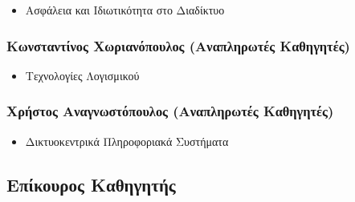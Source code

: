 \documentclass[
]{article}
\begin{document}
\begin{itemize}
\item
  Ασφάλεια και Ιδιωτικότητα στο Διαδίκτυο
\end{itemize}

\hypertarget{ux3baux3c9ux3bdux3c3ux3c4ux3b1ux3bdux3c4ux3afux3bdux3bfux3c2-ux3c7ux3c9ux3c1ux3b9ux3b1ux3bdux3ccux3c0ux3bfux3c5ux3bbux3bfux3c2-ux3b1ux3bdux3b1ux3c0ux3bbux3b7ux3c1ux3c9ux3c4ux3adux3c2-ux3baux3b1ux3b8ux3b7ux3b3ux3b7ux3c4ux3adux3c2}{%
\subsubsection{Κωνσταντίνος Χωριανόπουλος (Αναπληρωτές
Καθηγητές)}\label{ux3baux3c9ux3bdux3c3ux3c4ux3b1ux3bdux3c4ux3afux3bdux3bfux3c2-ux3c7ux3c9ux3c1ux3b9ux3b1ux3bdux3ccux3c0ux3bfux3c5ux3bbux3bfux3c2-ux3b1ux3bdux3b1ux3c0ux3bbux3b7ux3c1ux3c9ux3c4ux3adux3c2-ux3baux3b1ux3b8ux3b7ux3b3ux3b7ux3c4ux3adux3c2}}

\begin{itemize}
\item
  Τεχνολογίες Λογισμικού
\end{itemize}

\hypertarget{ux3c7ux3c1ux3aeux3c3ux3c4ux3bfux3c2-ux3b1ux3bdux3b1ux3b3ux3bdux3c9ux3c3ux3c4ux3ccux3c0ux3bfux3c5ux3bbux3bfux3c2-ux3b1ux3bdux3b1ux3c0ux3bbux3b7ux3c1ux3c9ux3c4ux3adux3c2-ux3baux3b1ux3b8ux3b7ux3b3ux3b7ux3c4ux3adux3c2}{%
\subsubsection{Χρήστος Αναγνωστόπουλος (Αναπληρωτές
Καθηγητές)}\label{ux3c7ux3c1ux3aeux3c3ux3c4ux3bfux3c2-ux3b1ux3bdux3b1ux3b3ux3bdux3c9ux3c3ux3c4ux3ccux3c0ux3bfux3c5ux3bbux3bfux3c2-ux3b1ux3bdux3b1ux3c0ux3bbux3b7ux3c1ux3c9ux3c4ux3adux3c2-ux3baux3b1ux3b8ux3b7ux3b3ux3b7ux3c4ux3adux3c2}}

\begin{itemize}
\item
  Δικτυοκεντρικά Πληροφοριακά Συστήματα
\end{itemize}

\hypertarget{ux3b5ux3c0ux3afux3baux3bfux3c5ux3c1ux3bfux3c2-ux3baux3b1ux3b8ux3b7ux3b3ux3b7ux3c4ux3aeux3c2}{%
\subsection{Επίκουρος
Καθηγητής}\label{ux3b5ux3c0ux3afux3baux3bfux3c5ux3c1ux3bfux3c2-ux3baux3b1ux3b8ux3b7ux3b3ux3b7ux3c4ux3aeux3c2}}
\end{document}
